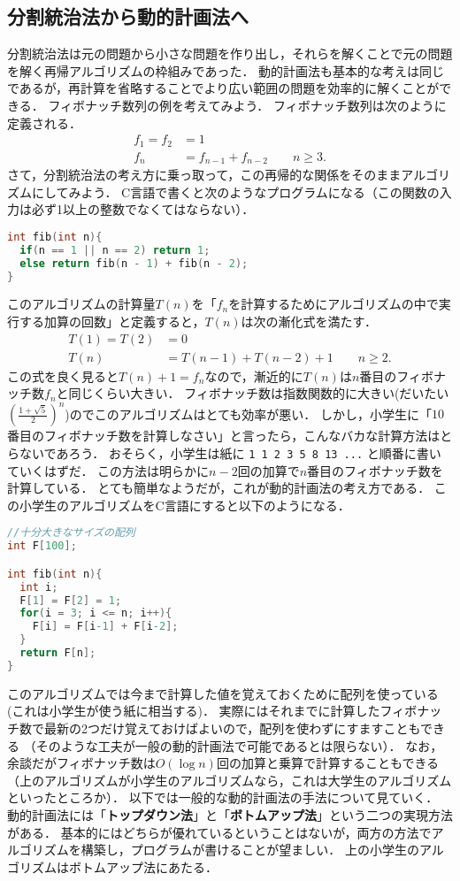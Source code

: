 \documentclass[a4paper,twoside,onecolumn,openany,article]{memoir}
\theoremstyle{remark}
\begin{document}
\subsection{分割統治法から動的計画法へ}
分割統治法は元の問題から小さな問題を作り出し，それらを解くことで元の問題を解く再帰アルゴリズムの枠組みであった．
動的計画法も基本的な考えは同じであるが，再計算を省略することでより広い範囲の問題を効率的に解くことができる．
フィボナッチ数列の例を考えてみよう．
フィボナッチ数列は次のように定義される．
\begin{align*}
f_1=f_2&=1\\
f_n&=f_{n-1}+f_{n-2}\qquad n\ge 3.
\end{align*}
さて，分割統治法の考え方に乗っ取って，この再帰的な関係をそのままアルゴリズムにしてみよう．
C言語で書くと次のようなプログラムになる（この関数の入力は必ず1以上の整数でなくてはならない）．
\begin{lstlisting}[basicstyle=\ttfamily\small,showstringspaces=false,language=C,frame=single]
int fib(int n){
  if(n == 1 || n == 2) return 1;
  else return fib(n - 1) + fib(n - 2);
}
\end{lstlisting}
このアルゴリズムの計算量$T(n)$を「$f_n$を計算するためにアルゴリズムの中で実行する加算の回数」と定義すると，$T(n)$は次の漸化式を満たす．
\begin{align*}
T(1)=T(2)&=0\\
T(n)&=T(n-1)+T(n-2) + 1\qquad n\ge 2.
\end{align*}
この式を良く見ると$T(n)+1=f_n$なので，漸近的に$T(n)$は$n$番目のフィボナッチ数$f_n$と同じくらい大きい．
フィボナッチ数は指数関数的に大きい(だいたい$\left(\frac{1+\sqrt{5}}2\right)^n$)のでこのアルゴリズムはとても効率が悪い．
しかし，小学生に「$10$番目のフィボナッチ数を計算しなさい」と言ったら，こんなバカな計算方法はとらないであろう．
おそらく，小学生は紙に \texttt{1  1  2  3 5 8 13 ...} と順番に書いていくはずだ．
この方法は明らかに$n-2$回の加算で$n$番目のフィボナッチ数を計算している．
とても簡単なようだが，これが動的計画法の考え方である．
この小学生のアルゴリズムをC言語にすると以下のようになる．
\begin{lstlisting}[basicstyle=\ttfamily\small,showstringspaces=false,language=C,frame=single]
//十分大きなサイズの配列
int F[100];

int fib(int n){
  int i;
  F[1] = F[2] = 1;
  for(i = 3; i <= n; i++){
    F[i] = F[i-1] + F[i-2];
  }
  return F[n];
}
\end{lstlisting}
このアルゴリズムでは今まで計算した値を覚えておくために配列を使っている(これは小学生が使う紙に相当する)．
実際にはそれまでに計算したフィボナッチ数で最新の2つだけ覚えておけばよいので，配列を使わずにすますこともできる
（そのような工夫が一般の動的計画法で可能であるとは限らない）．
なお，余談だがフィボナッチ数は$O(\log n)$回の加算と乗算で計算することもできる（上のアルゴリズムが小学生のアルゴリズムなら，これは大学生のアルゴリズムといったところか）．
以下では一般的な動的計画法の手法について見ていく．
動的計画法には「\textbf{トップダウン法}」と「\textbf{ボトムアップ法}」という二つの実現方法がある．
基本的にはどちらが優れているということはないが，両方の方法でアルゴリズムを構築し，プログラムが書けることが望ましい．
上の小学生のアルゴリズムはボトムアップ法にあたる．
\end{document}

